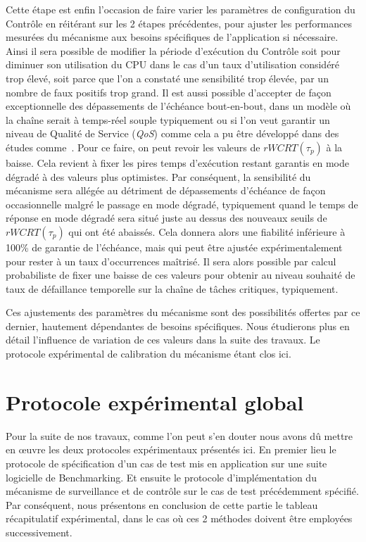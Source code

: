 \documentclass[french, a4paper, 11pt, twoside, pdftex]{StyleThese}
\begin{document}
		 Cette étape est enfin l'occasion de faire varier les paramètres de configuration du Contrôle en réitérant sur les 2 étapes précédentes, pour ajuster les performances mesurées du mécanisme aux besoins spécifiques de l'application si nécessaire. Ainsi il sera possible de modifier la période d'exécution du Contrôle soit  pour diminuer son utilisation du CPU dans le cas d'un taux d'utilisation considéré trop élevé, soit parce que l'on a constaté une sensibilité trop élevée, par un nombre de faux positifs trop grand.
		 Il est aussi possible d'accepter de façon exceptionnelle des dépassements de l'échéance bout-en-bout, dans un modèle où la chaîne serait à temps-réel souple typiquement ou si l'on veut garantir un niveau de Qualité de Service (\textit{QoS}) comme cela a pu être développé dans des études comme~\cite{lin_maximizing_2006}. Pour ce faire, on peut revoir les valeurs de $rWCRT(\tau_p)$ à la baisse. Cela revient à fixer les pires temps d'exécution restant garantis en mode dégradé à des valeurs plus optimistes. Par conséquent, la sensibilité du mécanisme sera allégée au détriment de dépassements d'échéance de façon occasionnelle malgré le passage en mode dégradé, typiquement quand le temps de réponse en mode dégradé sera situé juste au dessus des nouveaux seuils de $rWCRT(\tau_p)$ qui ont été abaissés. Cela donnera alors une fiabilité inférieure à 100\% de garantie de l'échéance, mais qui peut être ajustée expérimentalement pour rester à un taux d'occurrences maîtrisé. Il sera alors possible par calcul probabiliste de fixer une baisse de ces valeurs pour obtenir au niveau souhaité de taux de défaillance temporelle sur la chaîne de tâches critiques, typiquement.
		 
		 Ces ajustements des paramètres du mécanisme sont des possibilités offertes par ce dernier, hautement dépendantes de besoins spécifiques. Nous étudierons plus en détail l'influence de variation de ces valeurs dans la suite des travaux. Le protocole expérimental de calibration du mécanisme étant clos ici.    	
                	
                	
\section{Protocole expérimental global}
    
    Pour la suite de nos travaux, comme l'on peut s'en douter nous avons dû mettre en œuvre les deux protocoles expérimentaux présentés ici. En premier lieu le protocole de spécification d'un cas de test mis en application sur une suite logicielle de Benchmarking. Et ensuite le protocole d'implémentation du mécanisme de surveillance et de contrôle sur le cas de test précédemment spécifié. Par conséquent, nous présentons en conclusion de cette partie le tableau récapitulatif expérimental, dans le cas où ces 2 méthodes doivent être employées successivement.
    
\end{document}
